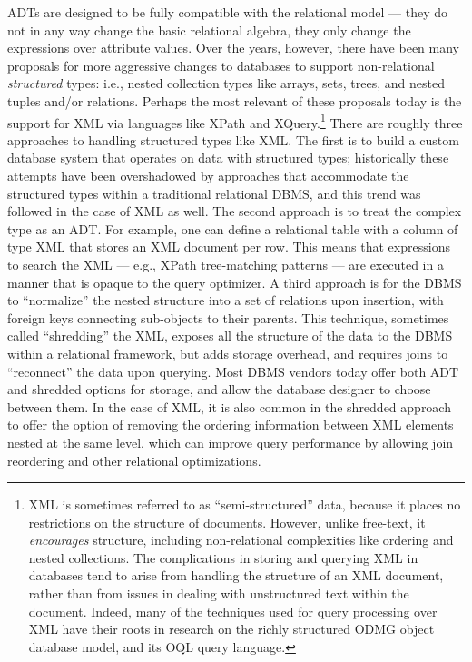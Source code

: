 \documentclass[b5paper,11pt,twoside,openright]{book}
\begin{document}
ADTs are designed to be fully compatible with the relational model ---
they do not in any way change the basic relational algebra, they only
change the expressions over attribute values. Over the years, however,
there have been many proposals for more aggressive changes to databases
to support non-relational \emph{structured} types: i.e., nested
collection types like arrays, sets, trees, and nested tuples and/or
relations. Perhaps the most relevant of these proposals today is the
support for XML via languages like XPath and XQuery.\footnote{XML is sometimes referred to as ``semi-structured'' data, because it
places no restrictions on the structure of documents. However, unlike
free-text, it \emph{encourages} structure, including non-relational
complexities like ordering and nested collections. The complications
in storing and querying XML in databases tend to arise from handling
the structure of an XML document, rather than from issues in dealing
with unstructured text within the document. Indeed, many of the
techniques used for query processing over XML have their roots in
research on the richly structured ODMG object database model, and its
OQL query language.}
There are roughly three approaches to handling structured types like
XML. The first is to build a custom database system that operates on
data with structured types; historically these attempts have been
overshadowed by approaches that accommodate the structured types within
a traditional relational DBMS, and this trend was followed in the case
of XML as well. The second approach is to treat the complex type as an
ADT. For example, one can define a relational table with a column of
type XML that stores an XML document per row. This means that
expressions to search the XML --- e.g., XPath tree-matching patterns ---
are executed in a manner that is opaque to the query optimizer. A third
approach is for the DBMS to ``normalize'' the nested structure into a
set of relations upon insertion, with foreign keys connecting
sub-objects to their parents. This technique, sometimes called
``shredding'' the XML, exposes all the structure of the data to the DBMS
within a relational framework, but adds storage overhead, and requires
joins to ``reconnect'' the data upon querying. Most DBMS vendors today
offer both ADT and shredded options for storage, and allow the database
designer to choose between them. In the case of XML, it is also common
in the shredded approach to offer the option of removing the ordering
information between XML elements nested at the same level, which
can improve query performance by allowing join reordering and other
relational optimizations.
\end{document}
